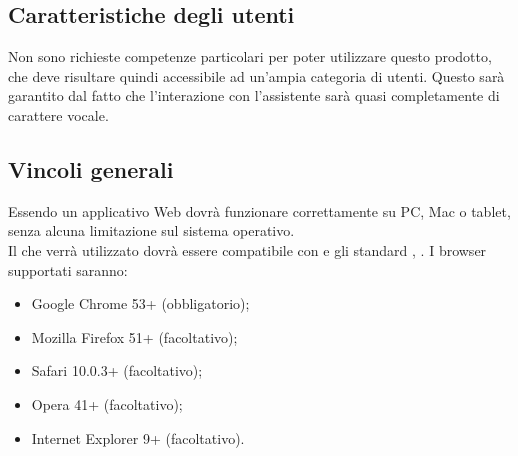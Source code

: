\subsection{Caratteristiche degli utenti}
Non sono richieste competenze particolari per poter utilizzare questo prodotto, che deve risultare
quindi accessibile ad un'ampia categoria di utenti. Questo sarà garantito dal fatto che l'interazione con l'assistente sarà quasi completamente di carattere vocale.
\subsection{Vincoli generali}
Essendo un applicativo Web dovrà funzionare correttamente su PC, Mac o tablet, senza alcuna limitazione sul sistema operativo.\\
Il  che verrà utilizzato dovrà essere compatibile con  e gli standard , .
I browser supportati saranno: 
\begin{itemize}
	\item Google Chrome 53+ (obbligatorio);
	\item Mozilla Firefox 51+ (facoltativo);
	\item Safari 10.0.3+ (facoltativo);
	\item Opera 41+ (facoltativo);
	\item Internet Explorer 9+ (facoltativo).
\end{itemize}